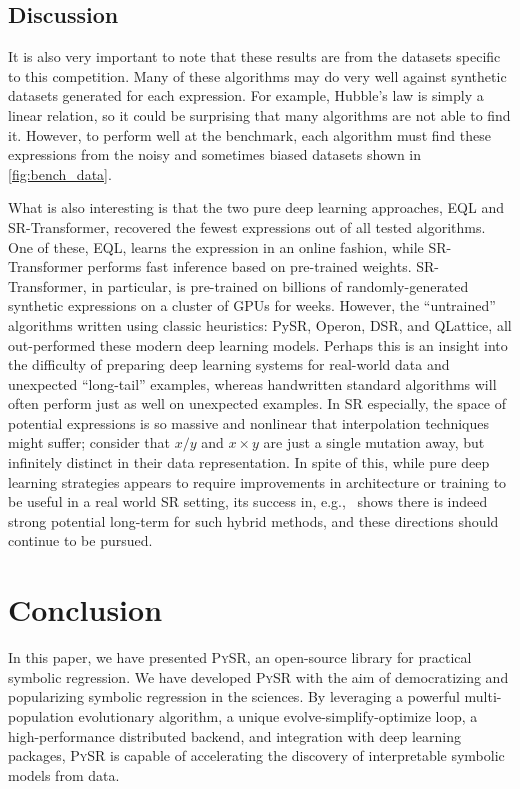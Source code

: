 \documentclass[letterpaper,twocolumn]{scrartcl}
\newcommand\pysr{\textsc{PySR}\xspace}
\begin{document}
\subsection{Discussion}

It is also very important to note that these results are from the datasets specific to this competition.
Many of these algorithms may do very well against synthetic datasets generated for each expression.
For example, Hubble's law is simply a linear relation, so it could be surprising that many algorithms are not able to find it.
However, to perform well at the benchmark, each algorithm must find these expressions from the noisy and sometimes biased datasets shown in \cref{fig:bench_data}.



What is also interesting is that the two pure deep learning approaches, EQL and SR-Transformer, recovered the fewest expressions out of all tested algorithms.
One of these, EQL, learns the expression in an online fashion, while SR-Transformer performs fast inference based on pre-trained weights.
SR-Transformer, in particular, is pre-trained on billions of randomly-generated synthetic expressions on a cluster of GPUs for weeks.
However, the ``untrained'' algorithms written using classic heuristics: PySR, Operon, DSR, and QLattice, all out-performed these modern deep learning models. 
Perhaps this is an insight into the difficulty of preparing deep learning systems for real-world data and unexpected ``long-tail'' examples, whereas handwritten standard algorithms will often perform just as well on unexpected examples.  In SR especially, the space of potential expressions is so massive and nonlinear that interpolation techniques might suffer; consider that $x/y$ and $x\times y$ are just a single mutation away, but infinitely distinct in their data representation.
In spite of this, while pure deep learning strategies appears to require improvements in architecture or training to be useful in a real world SR setting, its success in, e.g.,~\cite{cranmerDiscoveringSymbolicModels2020,petersenDeepSymbolicRegression2021,kamiennyEndtoendSymbolicRegression2022} shows there is indeed strong potential long-term for such hybrid methods, and these directions should continue to be pursued.


\section{Conclusion}

In this paper, we have presented \pysr, an open-source library for practical symbolic regression.
We have developed \pysr with the aim of democratizing and popularizing symbolic regression in the sciences.
By leveraging a powerful multi-population evolutionary algorithm, a unique evolve-simplify-optimize loop, a high-performance distributed backend, and integration with deep learning packages, \pysr is capable of accelerating the discovery of interpretable symbolic models from data.
\end{document}
